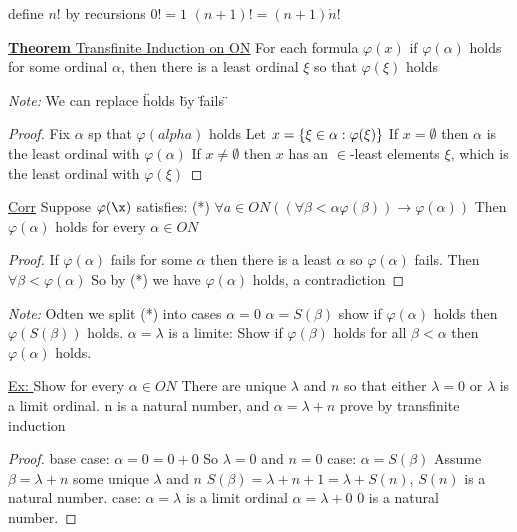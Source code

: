\documentclass{article}
\begin{document}
    define $n!$ by recursions
    $0! = 1$
    $(n+1)! = (n+1) \dot n!$

    \underline{\textbf{Theorem} Transfinite Induction on ON}
    For each formula $\varphi (x)$ if $\varphi(\alpha)$ holds for some ordinal $\alpha$, then there is a least ordinal $\xi$ so that $\varphi(\xi)$ holds

    \emph{Note: } We can replace \" holds \" by \" fails \"
    \begin{proof}
        Fix $\alpha$ sp that $\varphi(alpha)$ holds
        Let $x = \{\xi \in \alpha : \varphi(\xi)\}$
        If $ x = \emptyset$ then $\alpha$ is the least ordinal with $\varphi(\alpha)$
        If $x \neq \emptyset$ then $x$ has an $\in$-least elements $\xi$, which is the least ordinal with $\varphi(\xi)$
        \end{proof}

    \underline{Corr} Suppose $\varphi(\x)$ satisfies:
    (*) $\forall a \in ON (( \forall \beta < \alpha \varphi(\beta)) \rightarrow \varphi(\alpha))$
    Then $\varphi(\alpha)$ holds for every $\alpha \in ON$

    \begin{proof}
        If $\varphi(\alpha)$ fails for some $\alpha$ then there is a least $\alpha$ so $\varphi(\alpha)$ fails.
        Then $\forall \beta < \varphi(\alpha)$
        So by (*) we have $\varphi(\alpha)$ holds, a contradiction
        \end{proof}

    \emph{Note: } Odten we split (*) into cases
    $\alpha = 0$
    $\alpha = S(\beta)$ show if $\varphi(\alpha)$ holds then $\varphi(S(\beta))$ holds.
    $\alpha = \lambda$ is a limite: Show if $\varphi(\beta)$ holds for all $\beta < \alpha$ then $\varphi(\alpha)$ holds.

    \underline{Ex: } Show for every $\alpha \in ON$
    There are unique $\lambda$ and $n$ so that either $\lambda = 0$ or $\lambda$ is a limit ordinal.
    n is a natural number, and $\alpha = \lambda + n$
    prove by transfinite induction
    \begin{proof}
        base case:
        $\alpha = 0 = 0 + 0$
        So $\lambda = 0$ and $n = 0$
        case:
        $\alpha = S(\beta)$ Assume $\beta = \lambda + n$ some unique $\lambda$ and $n$
        $S(\beta) = \lambda + n + 1 = \lambda + S(n)$, $S(n)$ is a natural number.
        case:
        $\alpha = \lambda$ is a limit ordinal
        $\alpha = \lambda + 0$ 0 is a natural number.
        \end{proof}
\end{document}
